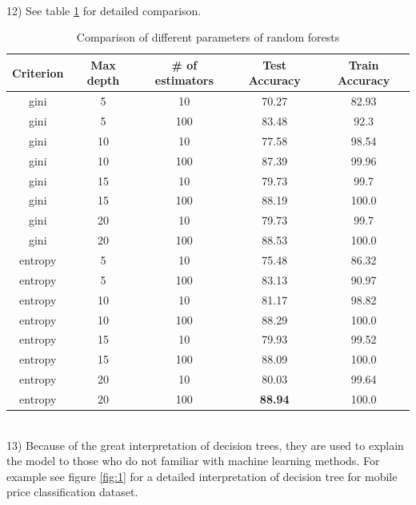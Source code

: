 \documentclass[11pt]{article}
\begin{document}
\\
12) See table \ref{tbl:3} for detailed comparison.
\begin{table}[]
\centering
\begin{tabular}{@{}ccccc@{}}
\toprule
\textbf{Criterion} & \textbf{Max depth} & \textbf{\# of estimators} & \textbf{Test Accuracy} & \textbf{Train Accuracy} \\ \midrule
gini & 5 & 10 & 70.27 & 82.93 \\
gini & 5 & 100 & 83.48 & 92.3 \\
gini & 10 & 10 & 77.58 & 98.54 \\
gini & 10 & 100 & 87.39 & 99.96 \\
gini & 15 & 10 & 79.73 & 99.7 \\
gini & 15 & 100 & 88.19 & 100.0 \\
gini & 20 & 10 & 79.73 & 99.7 \\
gini & 20 & 100 & 88.53 & 100.0 \\
entropy & 5 & 10 & 75.48 & 86.32 \\
entropy & 5 & 100 & 83.13 & 90.97 \\
entropy & 10 & 10 & 81.17 & 98.82 \\
entropy & 10 & 100 & 88.29 & 100.0 \\
entropy & 15 & 10 & 79.93 & 99.52 \\
entropy & 15 & 100 & 88.09 & 100.0 \\
entropy & 20 & 10 & 80.03 & 99.64 \\
entropy & 20 & 100 & \textbf{88.94} & 100.0 \\ \bottomrule
\end{tabular}
\caption{Comparison of different parameters of random forests}
\label{tbl:3}
\end{table}
\\
13) Because of the great interpretation of decision trees, they are used to explain the model to those who do not familiar with machine learning methods. For example see figure \ref{fig:1} for a detailed interpretation of decision tree for mobile price classification dataset.
\end{document}
